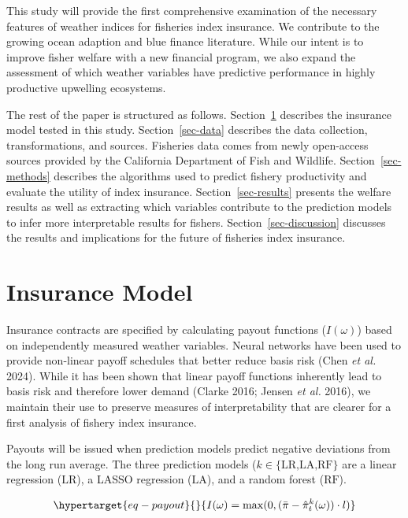 \documentclass[
  letterpaper,
  DIV=11,
  numbers=noendperiod]{scrartcl}
\begin{document}
This study will provide the first comprehensive examination of the
necessary features of weather indices for fisheries index insurance. We
contribute to the growing ocean adaption and blue finance literature.
While our intent is to improve fisher welfare with a new financial
program, we also expand the assessment of which weather variables have
predictive performance in highly productive upwelling ecosystems.

The rest of the paper is structured as follows. Section~\ref{sec-model}
describes the insurance model tested in this study.
Section~\ref{sec-data} describes the data collection, transformations,
and sources. Fisheries data comes from newly open-access sources
provided by the California Department of Fish and Wildlife.
Section~\ref{sec-methods} describes the algorithms used to predict
fishery productivity and evaluate the utility of index insurance.
Section~\ref{sec-results} presents the welfare results as well as
extracting which variables contribute to the prediction models to infer
more interpretable results for fishers. Section~\ref{sec-discussion}
discusses the results and implications for the future of fisheries index
insurance.

\hypertarget{sec-model}{%
\section{Insurance Model}\label{sec-model}}

Insurance contracts are specified by calculating payout functions
(\(I(\omega)\)) based on independently measured weather variables.
Neural networks have been used to provide non-linear payoff schedules
that better reduce basis risk (Chen \emph{et al.} 2024). While it has
been shown that linear payoff functions inherently lead to basis risk
and therefore lower demand (Clarke 2016; Jensen \emph{et al.} 2016), we
maintain their use to preserve measures of interpretability that are
clearer for a first analysis of fishery index insurance.

Payouts will be issued when prediction models predict negative
deviations from the long run average. The three prediction models
(\(k\in\{\text{LR,LA,RF}\}\) are a linear regression (\(\text{LR}\)), a
LASSO regression (\(\text{LA}\)), and a random forest (\(\text{RF}\)).

\begin{equation}\protect\hypertarget{eq-payout}{}{
I(\omega)=\max(0,(\bar{\pi}-\hat\pi_t^k(\omega)) \cdot l)
}\label{eq-payout}\end{equation}
\end{document}

